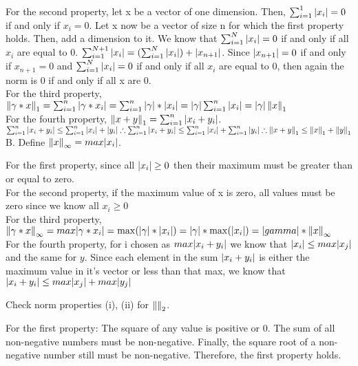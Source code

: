 \documentclass[12pt]{article}
\newenvironment{exercise}[2][Exercise]{\begin{trivlist}
\item[\hskip \labelsep {\bfseries #1}\hskip \labelsep {\bfseries #2.}]}{\end{trivlist}}
\begin{document}
For the second property, let x be a vector of one dimension. Then, $\sum_{i=1}^{1} |x_i| = 0$ if and only if $x_i=0$. Let x now be a vector of size n for which the first property holds. Then, add a dimension to it. We know that $\sum_{i=1}^{N} |x_i| = 0$ if and only if all $x_i$ are equal to 0. $\sum_{i=1}^{N+1} |x_i| = (\sum_{i=1}^{N} |x_i|) + |x_{n+1}|$. Since $|x_{n+1}| = 0$ if and only if $x_{n+1}=0$ and $\sum_{i=1}^{N} |x_i| = 0$ if and only if all $x_i$ are equal to 0, then again the norm is 0 if and only if all x are 0. \\

For the third property, $\left\lVert\gamma*x\right\rVert_{1} = \sum_{i=1}^{n} |\gamma * x_i| = \sum_{i=1}^{n} |\gamma|*|x_i| = |\gamma| \sum_{i=1}^{n} |x_i| = |\gamma|\left\lVert x\right\rVert_{1}$ \\ 

For the fourth property, $\left\lVert x+y\right\rVert_1 = \sum_{i=1}^{n} |x_i+y_i|$. $\sum_{i=1}^{n} |x_i+y_i| \leq \sum_{i=1}^{n} |x_i| + |y_i| \therefore \sum_{i=1}^{n} |x_i+y_i| \leq \sum_{i=1}^{n} |x_i| + \sum_{i=1}^{n} |y_i| \therefore \left\lVert x+y\right\rVert_1 \leq \left\lVert x\right\rVert_1 + \left\lVert y\right\rVert_1$ \\

B.
Define $\left\lVert x\right\rVert_{\infty} = max|x_i| $. 

For the first property, since all $|x_i| \geq 0$ then their maximum must be greater than or equal to zero.\\

For the second property, if the maximum value of x is zero, all values must be zero since we know all $x_i \geq 0$\\

For the third property, $\left\lVert\gamma*x\right\rVert_{\infty} = max|\gamma*x_i| = \max(|\gamma|*|x_i|) = |\gamma|*\max(|x_i|) = |gamma|*\left\lVert x\right\rVert_{\infty}$\\ 

For the fourth property, for i chosen as $max|x_i+y_i|$ we know that $|x_i| \leq max|x_j|$ and the same for $y$. Since each element in the sum $|x_i+y_i|$ is either the maximum value in it's vector or less than that max, we know that $|x_i+y_i| \leq max|x_j| + max|y_j|$

\begin{exercise}{1.3}
Check norm properties (i), (ii) for $\left\lVert\right\rVert_{2}$.
\end{exercise}
For the first property: The square of any value is positive or 0. The sum of all non-negative numbers must be non-negative. Finally, the square root of a non-negative number still must be non-negative. Therefore, the first property holds.\\
\end{document}
